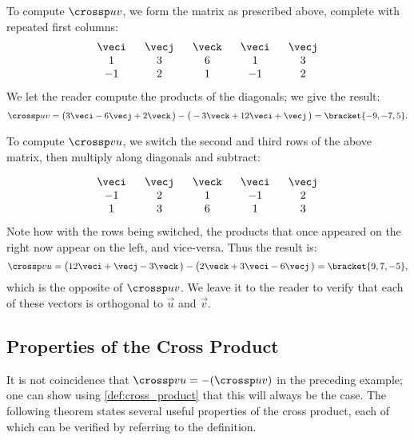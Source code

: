{To compute $\crossp uv$, we form the matrix as prescribed above, complete with repeated first columns:
\[\begin{array}{ccccc} \ \veci\ &\ \vecj\ &\ \veck\ &\ \veci\ &\ \vecj\ \\  1&3&6&1&3\\-1&2&1&-1&2\end{array}\]
We let the reader compute the products of the diagonals; we give the result:
\[\crossp uv = \big(3\veci-6\vecj+2\veck\,\big) - \big(-3\veck + 12\veci+\vecj\,\big) = \bracket{-9,-7,5}.\]

To compute $\crossp vu$, we switch the second and third rows of the above matrix, then multiply along diagonals and subtract:

\[\begin{array}{ccccc} \ \veci\ &\ \vecj\ &\ \veck\ &\ \veci\ &\ \vecj\ \\-1&2&1&-1&2\\  1&3&6&1&3\end{array}\]
Note how with the rows being switched, the products that once appeared on the right now appear on the left, and vice-versa. Thus the result is:
\[\crossp vu = \big(12\veci+\vecj-3\veck\,\big) - \big(2\veck + 3\veci-6\vecj\,\big) = \bracket{9,7,-5},\]
which is the opposite of $\crossp uv$. We leave it to the reader to verify that each of these vectors is orthogonal to $\vec u$ and $\vec v$.}

\subsection{Properties of the Cross Product}

It is not coincidence that $\crossp vu = -(\crossp uv)$ in the preceding example; one can show using \autoref{def:cross_product} that this will always be the case. The following theorem states several useful properties of the cross product, each of which can be verified by referring to the definition.

